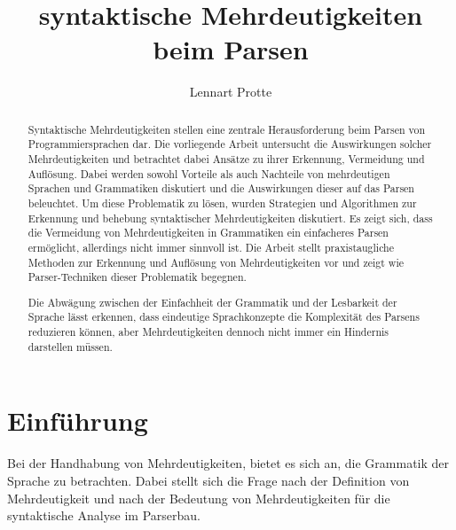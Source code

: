 \documentclass[runningheads]{llncs}
\begin{document}
%
    \title{syntaktische Mehrdeutigkeiten beim Parsen}
%
%
    \author{Lennart Protte}
%
%
%
    \maketitle              %
%
    \begin{abstract}
        Syntaktische Mehrdeutigkeiten stellen eine zentrale Herausforderung beim Parsen von Programmiersprachen dar.
        Die vorliegende Arbeit untersucht die Auswirkungen solcher Mehrdeutigkeiten
        und betrachtet dabei Ansätze zu ihrer Erkennung, Vermeidung und Auflösung.
        Dabei werden sowohl Vorteile als auch Nachteile von mehrdeutigen Sprachen und Grammatiken diskutiert
        und die Auswirkungen dieser auf das Parsen beleuchtet.
        Um diese Problematik zu lösen,
        wurden Strategien und Algorithmen zur Erkennung und behebung syntaktischer Mehrdeutigkeiten diskutiert.
        Es zeigt sich, dass die Vermeidung von Mehrdeutigkeiten in Grammatiken
        ein einfacheres Parsen ermöglicht, allerdings nicht immer sinnvoll ist.
        Die Arbeit stellt praxistaugliche Methoden zur Erkennung und Auflösung von Mehrdeutigkeiten vor
        und zeigt wie Parser-Techniken dieser Problematik begegnen.

        Die Abwägung zwischen der Einfachheit der Grammatik und der Lesbarkeit der Sprache lässt erkennen,
        dass eindeutige Sprachkonzepte die Komplexität des Parsens reduzieren können,
        aber Mehrdeutigkeiten dennoch nicht immer ein Hindernis darstellen müssen.

    \end{abstract}


    \section{Einführung}\label{sec:einfuhrung}
    Bei der Handhabung von Mehrdeutigkeiten, bietet es sich an, die Grammatik der Sprache zu betrachten.
    Dabei stellt sich die Frage nach der Definition von Mehrdeutigkeit
    und nach der Bedeutung von Mehrdeutigkeiten für die syntaktische Analyse im Parserbau.
\end{document}
